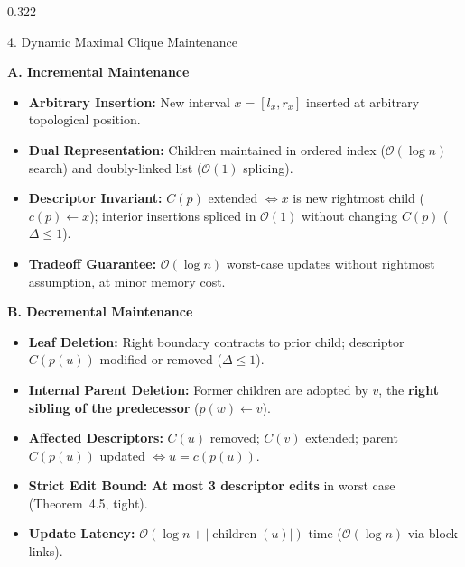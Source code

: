 \documentclass[final,17pt]{beamer}
\begin{document}
\begin{frame}[t]
\begin{columns}[t]
\begin{column}{0.322\textwidth}
\begin{posterbox}{4. Dynamic Maximal Clique Maintenance}
        \begin{minipage}[t]{0.485\linewidth}
            {\fontsize{10.5}{12.5}\selectfont \textbf{\color{accentBlue}A. Incremental Maintenance}}\par\vspace{2pt}
            {\fontsize{8.8}{11.4}\selectfont
            \begin{itemize}\setlength{\itemsep}{2.0pt}
                \item \textbf{Arbitrary Insertion:} New interval $x = [l_x, r_x]$ inserted at arbitrary topological position.
                \item \textbf{Dual Representation:} Children maintained in ordered index ($\mathcal{O}(\log n)$ search) and doubly-linked list ($\mathcal{O}(1)$ splicing).
                \item \textbf{Descriptor Invariant:} $C(p)$ extended $\iff x$ is new rightmost child ($c(p) \leftarrow x$); interior insertions spliced in $\mathcal{O}(1)$ without changing $C(p)$ ($\Delta \le 1$).
                \item \textbf{Tradeoff Guarantee:} $\mathcal{O}(\log n)$ worst-case updates without rightmost assumption, at minor memory cost.
            \end{itemize}
            }
        \end{minipage}
        \hfill
        \begin{minipage}[t]{0.485\linewidth}
            {\fontsize{10.5}{12.5}\selectfont \textbf{\color{accentRed}B. Decremental Maintenance}}\par\vspace{2pt}
            {\fontsize{8.8}{11.4}\selectfont
            \begin{itemize}\setlength{\itemsep}{2.0pt}
                \item \textbf{Leaf Deletion:} Right boundary contracts to prior child; descriptor $C(p(u))$ modified or removed ($\Delta \le 1$).
                \item \textbf{Internal Parent Deletion:} Former children are adopted by $v$, the \textbf{right sibling of the predecessor} ($p(w) \leftarrow v$).
                \item \textbf{Affected Descriptors:} $C(u)$ removed; $C(v)$ extended; parent $C(p(u))$ updated $\iff u = c(p(u))$.
                \item \textbf{Strict Edit Bound:} \textbf{At most 3 descriptor edits} in worst case (Theorem~4.5, tight).
                \item \textbf{Update Latency:} $\mathcal{O}(\log n + |\operatorname{children}(u)|)$ time ($\mathcal{O}(\log n)$ via block links).
            \end{itemize}
            }
        \end{minipage}


\end{posterbox}
\end{column}
\end{columns}
\end{frame}
\end{document}
